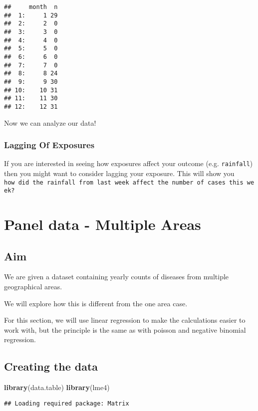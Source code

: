 \documentclass[]{book}
\newenvironment{Shaded}{\begin{snugshade}}{\end{snugshade}}
\newcommand{\KeywordTok}[1]{\textcolor[rgb]{0.13,0.29,0.53}{\textbf{#1}}}
\newcommand{\NormalTok}[1]{#1}
\begin{document}
\begin{verbatim}
##     month  n
##  1:     1 29
##  2:     2  0
##  3:     3  0
##  4:     4  0
##  5:     5  0
##  6:     6  0
##  7:     7  0
##  8:     8 24
##  9:     9 30
## 10:    10 31
## 11:    11 30
## 12:    12 31
\end{verbatim}

Now we can analyze our data!

\subsection{Lagging Of Exposures}\label{lagging-of-exposures}

If you are interested in seeing how exposures affect your outcome (e.g.
\texttt{rainfall}) then you might want to consider lagging your
exposure. This will show you
\texttt{how\ did\ the\ rainfall\ from\ last\ week\ affect\ the\ number\ of\ cases\ this\ week?}

\chapter{Panel data - Multiple Areas}\label{panel-data---multiple-areas}

\section{Aim}\label{aim-1}

We are given a dataset containing yearly counts of diseases from
multiple geographical areas.

We will explore how this is different from the one area case.

For this section, we will use linear regression to make the calculations
easier to work with, but the principle is the same as with poisson and
negative binomial regression.

\section{Creating the data}\label{creating-the-data}

\begin{Shaded}
\begin{Highlighting}[]
\KeywordTok{library}\NormalTok{(data.table)}
\KeywordTok{library}\NormalTok{(lme4)}
\end{Highlighting}
\end{Shaded}

\begin{verbatim}
## Loading required package: Matrix
\end{verbatim}
\end{document}
